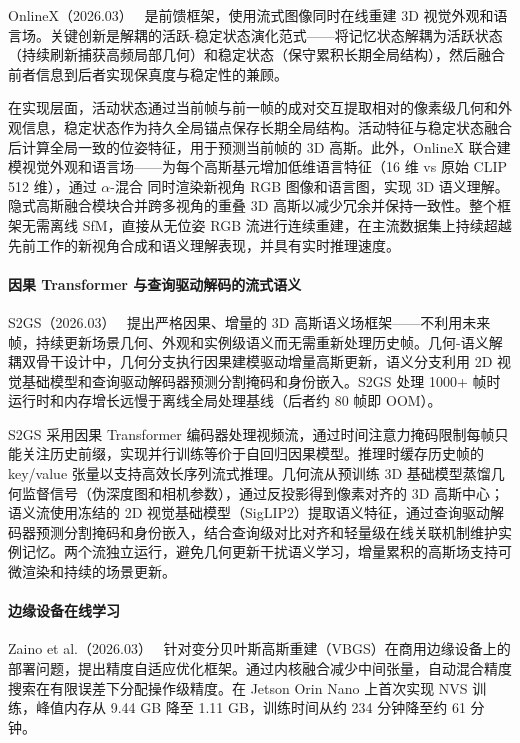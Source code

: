 OnlineX（2026.03）~\cite{2603_02134} 是前馈框架，使用流式图像同时在线重建 3D 视觉外观和语言场。关键创新是解耦的活跃-稳定状态演化范式——将记忆状态解耦为活跃状态（持续刷新捕获高频局部几何）和稳定状态（保守累积长期全局结构），然后融合前者信息到后者实现保真度与稳定性的兼顾。

在实现层面，活动状态通过当前帧与前一帧的成对交互提取相对的像素级几何和外观信息，稳定状态作为持久全局锚点保存长期全局结构。活动特征与稳定状态融合后计算全局一致的位姿特征，用于预测当前帧的 3D 高斯。此外，OnlineX 联合建模视觉外观和语言场——为每个高斯基元增加低维语言特征（16 维 vs 原始 CLIP 512 维），通过 $\alpha$-混合 同时渲染新视角 RGB 图像和语言图，实现 3D 语义理解。隐式高斯融合模块合并跨多视角的重叠 3D 高斯以减少冗余并保持一致性。整个框架无需离线 SfM，直接从无位姿 RGB 流进行连续重建，在主流数据集上持续超越先前工作的新视角合成和语义理解表现，并具有实时推理速度。

\paragraph{因果 Transformer 与查询驱动解码的流式语义}

S2GS（2026.03）~\cite{2603_14232} 提出严格因果、增量的 3D 高斯语义场框架——不利用未来帧，持续更新场景几何、外观和实例级语义而无需重新处理历史帧。几何-语义解耦双骨干设计中，几何分支执行因果建模驱动增量高斯更新，语义分支利用 2D 视觉基础模型和查询驱动解码器预测分割掩码和身份嵌入。S2GS 处理 1000+ 帧时运行时和内存增长远慢于离线全局处理基线（后者约 80 帧即 OOM）。

S2GS 采用因果 Transformer 编码器处理视频流，通过时间注意力掩码限制每帧只能关注历史前缀，实现并行训练等价于自回归因果模型。推理时缓存历史帧的 key/value 张量以支持高效长序列流式推理。几何流从预训练 3D 基础模型蒸馏几何监督信号（伪深度图和相机参数），通过反投影得到像素对齐的 3D 高斯中心；语义流使用冻结的 2D 视觉基础模型（SigLIP2）提取语义特征，通过查询驱动解码器预测分割掩码和身份嵌入，结合查询级对比对齐和轻量级在线关联机制维护实例记忆。两个流独立运行，避免几何更新干扰语义学习，增量累积的高斯场支持可微渲染和持续的场景更新。

\paragraph{边缘设备在线学习}

Zaino et al.（2026.03）~\cite{2603_08499} 针对变分贝叶斯高斯重建（VBGS）在商用边缘设备上的部署问题，提出精度自适应优化框架。通过内核融合减少中间张量，自动混合精度搜索在有限误差下分配操作级精度。在 Jetson Orin Nano 上首次实现 NVS 训练，峰值内存从 9.44 GB 降至 1.11 GB，训练时间从约 234 分钟降至约 61 分钟。

